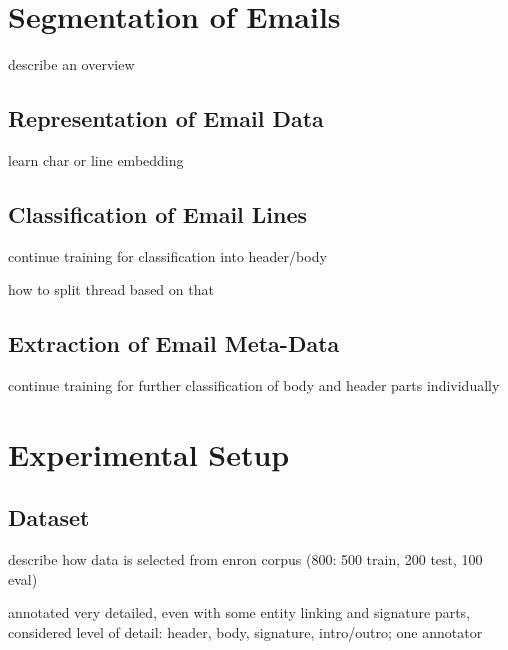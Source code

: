 \documentclass{llncs}
\begin{document}








\section{Segmentation of Emails}
describe an overview

\subsection{Representation of Email Data}
learn char or line embedding

\subsection{Classification of Email Lines}
continue training for classification into header/body

how to split thread based on that

\subsection{Extraction of Email Meta-Data}
continue training for further classification of body and header parts individually

\section{Experimental Setup}

\subsection{Dataset}
describe how data is selected from enron corpus (800: 500 train, 200 test, 100 eval)

annotated very detailed, even with some entity linking and signature parts, considered level of detail: header, body, signature, intro/outro; one annotator
\end{document}
